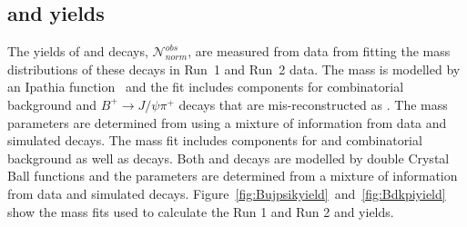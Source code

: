 {{\subsection{\bdkpi and \bujpsik yields}
\label{sec:yeilds}
The yields of \bujpsik and \bdkpi decays, $ \mathcal{N}^{obs}_{norm}$, are measured from data from fitting the mass distributions of these decays in Run~1 and Run~2 data. %
The \bujpsik mass \pdf is modelled by an Ipathia function~\cite{Santos:2013gra} and the fit includes components for combinatorial background and $B^{+} \to J/\psi \pi^{+}$ decays that are mis-reconstructed as \bujpsik. The mass \pdf parameters are determined from using a mixture of information from data and simulated decays. The \bdkpi mass fit includes components for \bskpi and combinatorial background as well as \bdkpi decays. Both \bdkpi and \bskpi decays are modelled by double Crystal Ball functions and the parameters are determined from a mixture of information from data and simulated decays. %
Figure~\ref{fig:Bujpsikyield}~and~\ref{fig:Bdkpiyield} show the mass fits used to calculate the Run 1 and Run 2 \bujpsik and \bdkpi yields.





}}
